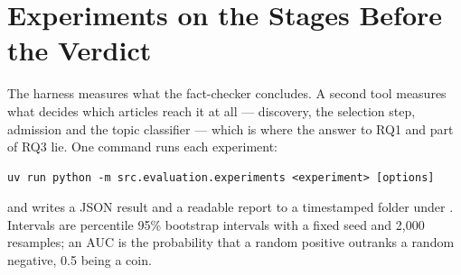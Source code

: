 
\section{Experiments on the Stages Before the Verdict}
\label{sec:experiments-pre-verdict}

The harness measures what the fact-checker concludes. A second tool
measures what decides which articles reach it at all --- discovery, the
selection step, admission and the topic classifier --- which is where
the answer to RQ1 and part of RQ3 lie. One command runs each experiment:

\begin{lstlisting}
uv run python -m src.evaluation.experiments <experiment> [options]
\end{lstlisting}

and writes a JSON result and a readable report to a timestamped folder
under . Intervals are
percentile 95\% bootstrap intervals with a fixed seed and 2,000
resamples; an AUC is the probability that a random positive outranks a
random negative, 0.5 being a coin.

